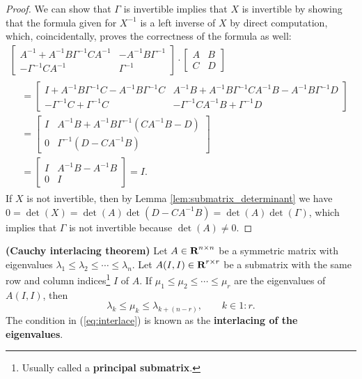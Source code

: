 \documentclass{article}
\begin{document}
	\begin{proof}
		We can show that $\Gamma$ is invertible implies that $X$ is invertible by showing that the formula given for $X^{-1}$ is a left inverse of $X$ by direct computation, which, coincidentally, proves the correctness of the formula as well:
		\begin{multline}
			\left[\begin{matrix}
				A^{-1} + A^{-1}B\Gamma^{-1}CA^{-1} & -A^{-1}B\Gamma^{-1} \\
				-\Gamma^{-1}CA^{-1}& \Gamma^{-1}
			\end{matrix}\right]\cdot\left[\begin{matrix}
				A & B \\
				C & D
			\end{matrix}\right]\\
			\begin{aligned}
			&= \left[\begin{matrix}
				I + A^{-1}B\Gamma^{-1}C - A^{-1}B\Gamma^{-1}C & A^{-1}B + A^{-1}B\Gamma^{-1}CA^{-1}B -A^{-1}B\Gamma^{-1}D  \\
				-\Gamma^{-1}C+\Gamma^{-1}C & -\Gamma^{-1}CA^{-1}B + \Gamma^{-1}D
			\end{matrix}\right] \\
			&= \left[\begin{matrix}
				I &  A^{-1}B + A^{-1}B\Gamma^{-1}\left(CA^{-1}B-D\right)\\
				0 & \Gamma^{-1}\left(D - CA^{-1}B\right)
			\end{matrix}\right]\\
			&=\left[\begin{matrix}
				I & A^{-1}B - A^{-1}B \\
				0 & I
			\end{matrix}\right] = I.
			\end{aligned}
		\end{multline}
		If $X$ is not invertible, then by Lemma \ref{lem:submatrix_determinant} we have $0 =\det(X) = \det(A)\det(D-CA^{-1}B) = \det(A)\det(\Gamma)$, which implies that $\Gamma$ is not invertible because $\det(A) \ne 0$.
	\end{proof}
	
	\begin{lem} \textnormal{\bf(Cauchy interlacing theorem)}
		\label{lem:cauchy_interlace}
		Let $A \in \textnormal{\bf R}^{n\times n}$ be a symmetric matrix with eigenvalues $\lambda_1 \le \lambda_2 \le \cdots \le \lambda_n$. Let $A(I,I) \in \textnormal{\bf R}^{r\times r}$ be a submatrix with the same row and column indices\footnote{Usually called a \textbf{principal submatrix}.} $I$ of $A$. If $\mu_1 \le \mu_2 \le\cdots\le\mu_r$ are the eigenvalues of $A(I,I)$, then
		\begin{equation}
			\label{eq:interlace}
			\lambda_k \le \mu_k \le \lambda_{k + (n-r)}, \qquad k\in 1:r.
		\end{equation}
		The condition in (\ref{eq:interlace}) is known as the \textbf{interlacing of the eigenvalues}.
	\end{lem}
	
\end{document}
